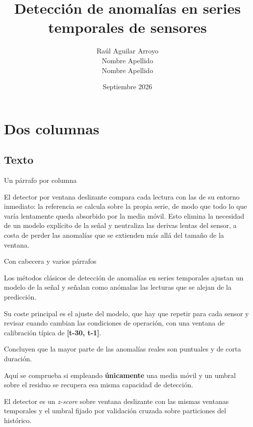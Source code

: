 \documentclass[aspectratio=169,9pt]{beamer}
\title{Detección de anomalías en series temporales de sensores}
\date{Septiembre 2026}
\author{Raúl Aguilar Arroyo\\Nombre Apellido\\Nombre Apellido}
\begin{document}
\begin{frame}
  \titlepage
\end{frame}

\section{Dos columnas}

\subsection{Texto}

\begin{frame}{Un párrafo por columna}
\begin{twocols}
  El detector por ventana deslizante compara cada lectura con las de su
  entorno inmediato: la referencia se calcula sobre la propia serie, de modo
  que todo lo que varía lentamente queda absorbido por la media móvil.
\nextcol
  Esto elimina la necesidad de un modelo explícito de la señal y neutraliza
  las derivas lentas del sensor, a costa de perder las anomalías que se
  extienden más allá del tamaño de la ventana.
\end{twocols}
\end{frame}

\begin{frame}{Con cabecera y varios párrafos}
\begin{twocols}

  Los métodos clásicos de detección de anomalías en series temporales
  ajustan un modelo de la señal y señalan como anómalas las lecturas que se
  alejan de la predicción.

  Su coste principal es el ajuste del modelo, que hay que repetir para cada
  sensor y revisar cuando cambian las condiciones de operación, con una
  ventana de calibración típica de \textbf{[t-30, t-1]}.

  Concluyen que la mayor parte de las anomalías reales son puntuales y de
  corta duración.
\nextcol

  Aquí se comprueba si empleando \textbf{únicamente} una media móvil y un
  umbral sobre el residuo se recupera esa misma capacidad de detección.

  El detector es un \emph{z-score} sobre ventana deslizante con las mismas
  ventanas temporales y el umbral fijado por validación cruzada sobre
  particiones del histórico.
\end{twocols}
\end{frame}
\end{document}

